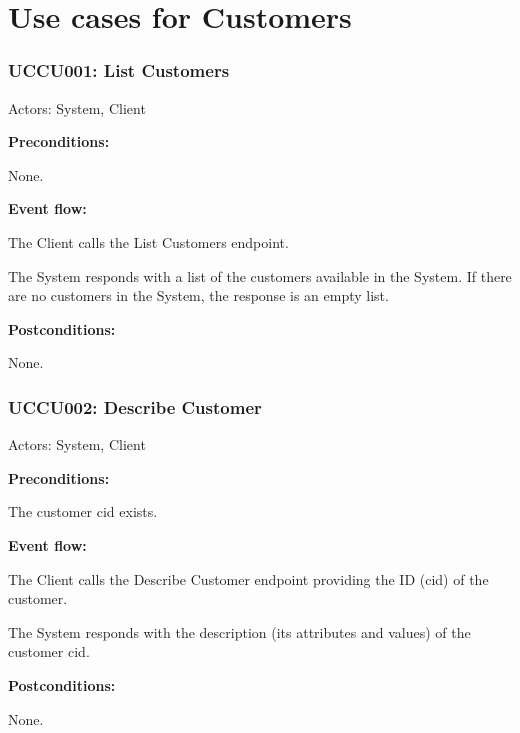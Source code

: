 \section{Use cases for Customers}

\begin{ucbox}{\subsubsection{UCCU001: List Customers}}
\label{UCCU001}

Actors: System, Client

\textbf{Preconditions:}

\ucitem None.

\textbf{Event flow:}

\ucitem The Client calls the List Customers endpoint.

\ucitem The System responds with a list of the customers available in the System. If there are no customers in the System, the response is an empty list.

\textbf{Postconditions:}

\ucitem None.

\end{ucbox}

\begin{ucbox}{\subsubsection{UCCU002: Describe Customer}}
\label{UCCU002}

Actors: System, Client

\textbf{Preconditions:}

\ucitem The customer cid exists.

\textbf{Event flow:}

\ucitem The Client calls the Describe Customer endpoint providing the ID (cid) of the customer.

\ucitem The System responds with the description (its attributes and values) of the customer cid.

\textbf{Postconditions:}

\ucitem None.

\end{ucbox}

